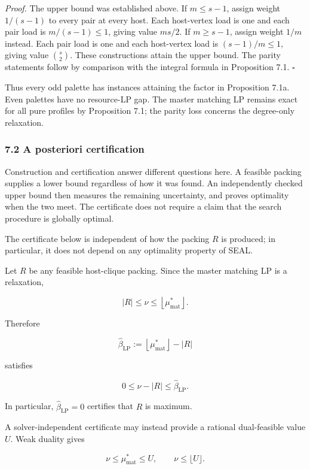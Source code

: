 \documentclass[english,11pt,a4paper]{article}
\begin{document}
\emph{Proof.} The upper bound was established above. If \(m\le s-1\),
assign weight \(1/(s-1)\) to every pair at every host. Each host-vertex
load is one and each pair load is \(m/(s-1)\le1\), giving value
\(ms/2\). If \(m\ge s-1\), assign weight \(1/m\) instead. Each pair load
is one and each host-vertex load is \((s-1)/m\le1\), giving value
\(\binom{s}{2}\). These constructions attain the upper bound. The parity
statements follow by comparison with the integral formula in Proposition
7.1. \(\square\)

Thus every odd palette has instances attaining the factor in Proposition
7.1a. Even palettes have no resource-LP gap. The master matching LP
remains exact for all pure profiles by Proposition 7.1; the parity loss
concerns the degree-only relaxation.

\subsubsection{7.2 A posteriori
certification}\label{a-posteriori-certification}

Construction and certification answer different questions here. A
feasible packing supplies a lower bound regardless of how it was found.
An independently checked upper bound then measures the remaining
uncertainty, and proves optimality when the two meet. The certificate
does not require a claim that the search procedure is globally optimal.

The certificate below is independent of how the packing \(R\) is
produced; in particular, it does not depend on any optimality property
of SEAL.

Let \(R\) be any feasible host-clique packing. Since the master matching
LP is a relaxation,

\[
|R|
\le
\nu
\le
\left\lfloor\mu^*_{\mathrm{mat}}\right\rfloor.
\]

Therefore

\[
\widehat\beta_{\mathrm{LP}}
:=
\left\lfloor\mu^*_{\mathrm{mat}}\right\rfloor-|R|
\]

satisfies

\[
0\le\nu-|R|\le\widehat\beta_{\mathrm{LP}}.
\]

In particular, \(\widehat\beta_{\mathrm{LP}}=0\) certifies that \(R\) is
maximum.

A solver-independent certificate may instead provide a rational
dual-feasible value \(U\). Weak duality gives

\[
\nu
\le
\mu^*_{\mathrm{mat}}
\le
U,
\qquad
\nu\le\lfloor U\rfloor.
\]
\end{document}
